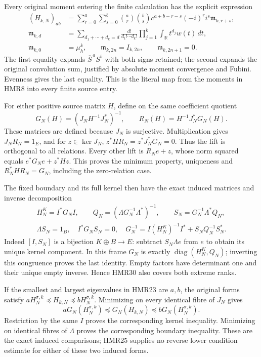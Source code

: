 Every original moment entering the finite calculation
has the explicit expression
\[
 \begin{aligned}
 (H_{k,N})_{ab}
 &=\sum_{r=0}^a\sum_{s=0}^b
 \binom ar\binom bs c^{a+b-r-s}(-i)^r i^s
                       \mathfrak m_{k,r+s},\\
 \mathfrak m_{k,d}
 &=\sum_{d_1+\cdots+d_k=d}
       \frac{d!}{d_1!\cdots d_k!}
          \prod_{j=1}^k\int_{\mathbb R}t^{d_j}w(t)\,dt,\\
 \mathfrak m_{k,0}&=\mu_h^k,\qquad
 \mathfrak m_{k,2n}=I_{k,2n},\qquad
 \mathfrak m_{k,2n+1}=0 .
 \end{aligned}\tag{HMR28}
\]
The first equality expands $\overline S^{\,a}S^b$
with both signs retained; the second expands the
original convolution sum, justified by absolute
moment convergence and Fubini. Evenness gives the
last equality. This is the literal map from the
moments in HMR8 into every finite source entry.

For either positive source matrix $H$, define on
the same coefficient quotient
\[
 G_N(H)=(J_NH^{-1}J_N^*)^{-1},\qquad
 R_N(H)=H^{-1}J_N^*G_N(H).
 \tag{HMR29}
\]
These matrices are defined because $J_N$ is surjective.
Multiplication gives $J_NR_N=1_E$, and for
$z\in\ker J_N$,
$z^*HR_N=z^*J_N^*G_N=0$. Thus the lift is orthogonal
to all relations. Every other lift is $R_Ne+z$,
whose norm squared equals $e^*G_Ne+z^*Hz$.
This proves the minimum property, uniqueness and
$R_N^*HR_N=G_N$, including the zero-relation case.

The fixed boundary and its full kernel then have
the exact induced matrices and inverse decomposition
\[
 \begin{gathered}
 H_N^K=I^*G_NI,\qquad
 Q_N=(\Lambda G_N^{-1}\Lambda^*)^{-1},\qquad
 S_N=G_N^{-1}\Lambda^*Q_N,\\
 \Lambda S_N=1_B,\quad I^*G_NS_N=0,\quad
 G_N^{-1}=I(H_N^K)^{-1}I^*+S_NQ_N^{-1}S_N^* .
 \end{gathered}\tag{HMR30}
\]
Indeed $[I,S_N]$ is a bijection $K\oplus B\to E$:
subtract $S_N\Lambda e$ from $e$ to obtain its
unique kernel component. In this frame $G_N$
is exactly $\operatorname{diag}(H_N^K,Q_N)$;
inverting this congruence proves the last identity.
Empty factors have determinant one and their unique
empty inverse. Hence HMR30 also covers both extreme ranks.

If the smallest and largest eigenvalues in HMR23
are $a,b$, the original forms satisfy
$aH_N^{\sigma,k}\preceq H_{k,N}\preceq bH_N^{\sigma,k}$.
Minimizing on every identical fibre of $J_N$ gives
\[
 aG_N(H_N^{\sigma,k})\preceq G_N(H_{k,N})
                  \preceq bG_N(H_N^{\sigma,k}).
 \tag{HMR31}
\]
Restriction by the same $I$ proves the corresponding
kernel inequality. Minimizing on identical fibres
of $\Lambda$ proves the corresponding boundary
inequality. These are the exact induced comparisons;
HMR25 supplies no reverse lower condition estimate
for either of these two induced forms.

